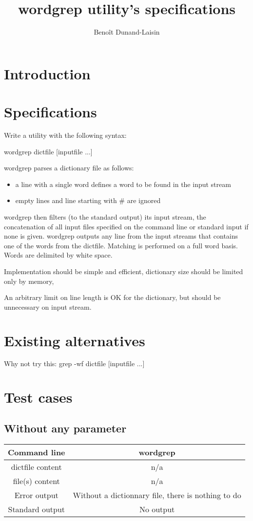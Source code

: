\documentclass[11pt]{article} %
\title{wordgrep utility's specifications}
\author{Benoît Dunand-Laisin}
\begin{document}
\maketitle

\section{Introduction}

\section{Specifications}
Write a utility with the following syntax:

      wordgrep dictfile [inputfile ...]

wordgrep parses a dictionary file as follows:
\begin{itemize}
\item a line with a single word defines a word to be found in the input stream
\item empty lines and line starting with \# are ignored
\end{itemize}
   wordgrep then filters (to the standard output) its input stream, the
   concatenation of all input files specified on the command line or standard
   input if none is given.  wordgrep outputs any line from the input streams that
   contains one of the words from the dictfile. Matching is performed on a full
   word basis.  Words are delimited by white space.

   Implementation should be simple and efficient, dictionary size should be
   limited only by memory,

      An arbitrary limit on line length is OK for the dictionary, but should
   be unnecessary on input stream. 

\section{Existing alternatives}
Why not try this:
grep -wf dictfile [inputfile ...]

\section{Test cases}

\subsection{Without any parameter}
\begin{tabular}{|c|c|}
\hline
Command line &
wordgrep\\
\hline
dictfile content &
n/a\\
\hline
file(s) content &
n/a\\
\hline
Error output &
Without a dictionnary file, there is nothing to do\\
\hline
Standard output &
No output\\
\hline
\end{tabular}
\end{document}

